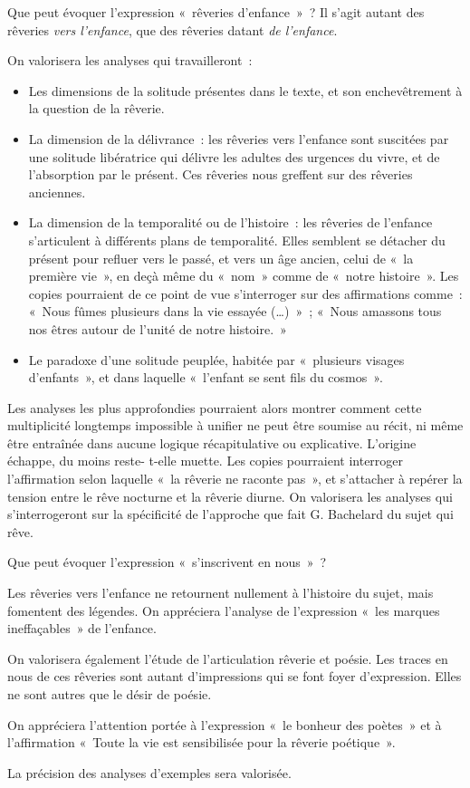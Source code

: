 		{Que peut évoquer l'expression «~rêveries d'enfance~»~? Il s'agit autant des rêveries
\emph{vers l'enfance}, que des rêveries datant \emph{de l'enfance}.

On valorisera les analyses qui travailleront~:
\begin{itemize}
\item Les dimensions de la solitude présentes dans le texte, et son
enchevêtrement à la question de la rêverie.
\item La dimension de la délivrance~: les rêveries vers l'enfance sont
suscitées par une solitude libératrice qui délivre les adultes des
urgences du vivre, et de l'absorption par le présent. Ces rêveries nous
greffent sur des rêveries anciennes.
\item La dimension de la temporalité ou de l'histoire~: les rêveries de
l'enfance s'articulent à différents plans de temporalité. Elles semblent
se détacher du présent pour refluer vers le passé, et vers un âge
ancien, celui de «~la première vie~», en deçà même du «~nom~»
comme de «~notre histoire~». Les copies pourraient de ce point de vue
s'interroger sur des affirmations comme~: «~Nous fûmes plusieurs
dans la vie essayée (…)~»~; «~Nous amassons tous nos êtres autour
de l'unité de notre histoire.~»
\item Le paradoxe d'une solitude peuplée, habitée par «~plusieurs visages
d'enfants~», et dans laquelle «~l'enfant se sent fils du cosmos~».
\end{itemize}

Les analyses les plus approfondies pourraient alors montrer comment cette multiplicité
longtemps impossible à unifier ne peut être soumise au récit, ni même être entraînée
dans aucune logique récapitulative ou explicative. L'origine échappe, du moins reste-
t-elle muette. Les copies pourraient interroger l'affirmation selon laquelle «~la rêverie ne raconte pas~», et s'attacher à repérer la tension entre le rêve nocturne et la rêverie
diurne. On valorisera les analyses qui s'interrogeront sur la spécificité de l'approche
que fait G. Bachelard du sujet qui rêve.

\bigskip

Que peut évoquer l'expression «~s'inscrivent en nous~»~?

Les rêveries vers l'enfance ne retournent nullement à l'histoire du sujet, mais
fomentent des légendes. On appréciera l'analyse de l'expression «~les marques
ineffaçables~» de l'enfance.

On valorisera également l'étude de l'articulation rêverie et poésie. Les traces en nous
de ces rêveries sont autant d'impressions qui se font foyer d'expression. Elles ne sont
autres que le désir de poésie.

On appréciera l'attention portée à l'expression «~le bonheur des poètes~» et à
l'affirmation «~Toute la vie est sensibilisée pour la rêverie poétique~».

\bigskip

La précision des analyses d'exemples sera valorisée.}%

